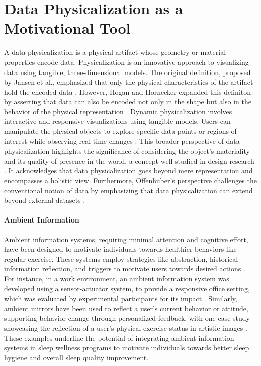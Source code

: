 \documentclass[
  a4paper,  %
  twoside,  %
  bibliography=totoc,
  headsepline,
  cleardoublepage=empty,
  parskip=half,
  draft=false
]{scrbook}
\begin{document}
\section{Data Physicalization as a Motivational Tool}
A data physicalization is a physical artifact whose geometry or material properties encode data. Physicalization is an innovative approach to visualizing data using tangible, three-dimensional models. The original definition, proposed by Jansen et al., emphasized that only the physical characteristics of the artifact hold the encoded data \cite{Oppotunieites_Challenges_DataPhysicalization}. However, Hogan and Hornecker expanded this definiton by asserting that data can also be encoded not only in the shape but also in the behavior of the physical representation \cite{Representation_Modality_Data_Artifacts}.
Dynamic physicalization involves interactive and responsive visualizations using tangible models. Users can manipulate the physical objects to explore specific data points or regions of interest while observing real-time changes \cite{Oppotunieites_Challenges_DataPhysicalization}. This broader perspective of data physicalization highlights the significance of considering the object's materiality and its quality of presence in the world, a concept well-studied in design research \cite{Structures_Forms_Stuff_Interaction, Materiality_of_interaction}. It acknowledges that data physicalization goes beyond mere representation and encompasses a holistic view. Furthermore, Offenhuber's perspective challenges the conventional notion of data by emphasizing that data physicalization can extend beyond external datasets \cite{Talk_About_Physicality}.
\paragraph{Ambient Information}
Ambient information systems, requiring minimal attention and cognitive effort, have been designed to motivate individuals towards healthier behaviors like regular exercise. These systems employ strategies like abstraction, historical information reflection, and triggers to motivate users towards desired actions \cite{rodriguez_cammina_2013}. For instance, in a work environment, an ambient information system was developed using a sensor-actuator system, to provide a responsive office setting, which was evaluated by experimental participants for its impact \cite{streitz_ambient_2023}. Similarly, ambient mirrors have been used to reflect a user's current behavior or attitude, supporting behavior change through personalized feedback, with one case study showcasing the reflection of a user's physical exercise status in artistic images \cite{nakajima_designing_2013}.
These examples underline the potential of integrating ambient information systems in sleep wellness programs to motivate individuals towards better sleep hygiene and overall sleep quality improvement.
\end{document}

